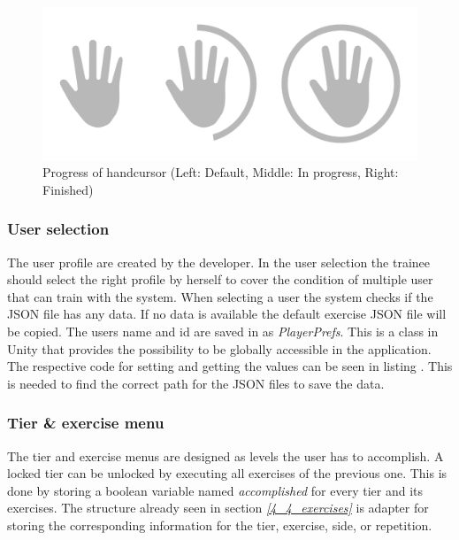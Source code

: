 
\begin{figure}[htb]
	\centering
	\begin{minipage}[t]{1\linewidth}
		\centering
		\includegraphics[width=0.6\linewidth]{Pictures/handcursorProgress}
		\caption{Progress of handcursor (Left: Default, Middle: In progress, Right: Finished)}
		\label{fig:handcursorProgress}
	\end{minipage}
\end{figure}

\subsubsection{User selection}
The user profile are created by the developer. In the user selection the trainee should select the right profile by herself to cover the condition of multiple user that can train with the system. When selecting a user the system checks if the JSON file has any data. If no data is available the default exercise JSON file will be copied. The users name and id are saved in as \textit{PlayerPrefs}. This is a class in Unity that provides the possibility to be globally accessible in the application. The respective code for setting and getting the values can be seen in listing . This is needed to find the correct path for the JSON files to save the data.


\subsubsection{Tier \& exercise menu}
The tier and exercise menus are designed as levels the user has to accomplish. A locked tier can be unlocked by executing all exercises of the previous one. This is done by storing a boolean variable named \textit{accomplished} for every tier and its exercises. The structure already seen in section \textit{\ref{4_4_exercises}} is adapter for storing the corresponding information for the tier, exercise, side, or repetition.

